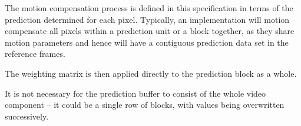 
\begin{informative}
The motion compensation process is defined in this specification in
terms of the prediction determined for each pixel. Typically, an
implementation will motion compensate all pixels within a prediction
unit or a block together, as they share motion parameters and hence will
have a contiguous prediction data set in the reference frames.


The weighting matrix is then applied directly
to the prediction block as a whole.

It is not necessary for the prediction buffer to consist of the whole video
component -- it could be a single row of blocks, with values being overwritten
successively.
\end{informative}

\begin{comment}
The process for a single video component is effectively:

-- Starting with an empty prediction buffer,
pred(x,y) = 0, forall x,y

for r = 0 to numrefs:
    -- upconvert the reference frame and clip the results
    ref'_r(x,y) = clip(upconvert(ref_r,x,y),0,2^{video_depth})

    -- perform block prediction, OBMC weighting and reference weighting,
    -- accumumulating the results into the prediction buffer.
    foreach b in blocks:
        b'pred(x,y) = block_predict(b,x,y)

        -- choosereference weight contribution
        W <- ...

        for i = 0 to yblen:
            for j = 0 to xblen:
                -- accumulate predicted pixels into prediction buffer
                pred

\end{comment}

